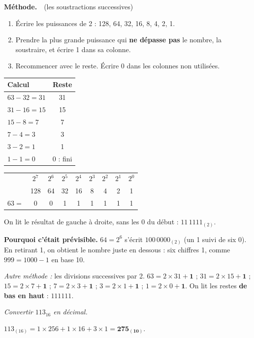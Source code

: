 \documentclass[addpoints, 11pt]{exam}
\newcommand{\enonce}[1]{\textit{#1}\par\smallskip}
\newcommand{\methode}{\par\smallskip\noindent\textbf{Méthode.}\ }
\DeclareRobustCommand{\_}{\textunderscore\allowbreak}
\begin{document}
\begin{questions}
\methode\ (les soustractions successives)
\begin{enumerate}
  \item Écrire les puissances de 2 : 128, 64, 32, 16, 8, 4, 2, 1.
  \item Prendre la plus grande puissance qui \textbf{ne dépasse pas} le nombre, la soustraire, et écrire 1 dans sa colonne.
  \item Recommencer avec le reste. Écrire 0 dans les colonnes non utilisées.
\end{enumerate}
\begin{center}
\begin{tabular}{|l|c|}
\hline
Calcul & Reste \\ \hline
$63 - 32 = 31$ & 31 \\
$31 - 16 = 15$ & 15 \\
$15 - 8 = 7$ & 7 \\
$7 - 4 = 3$ & 3 \\
$3 - 2 = 1$ & 1 \\
$1 - 1 = 0$ & 0 : fini \\ \hline
\end{tabular}
\qquad
\begin{tabular}{l|cccccccc}
 & $2^7$ & $2^6$ & $2^5$ & $2^4$ & $2^3$ & $2^2$ & $2^1$ & $2^0$\\
 & 128 & 64 & 32 & 16 & 8 & 4 & 2 & 1\\ \hline
$63 =$ & 0 & 0 & 1 & 1 & 1 & 1 & 1 & 1\\
\end{tabular}
\end{center}
On lit le résultat de gauche à droite, sans les 0 du début : $11\,1111_{(2)}$.

\textbf{Pourquoi c'était prévisible.} $64 = 2^6$ s'écrit $100\,0000_{(2)}$ (un 1 suivi de six 0). En retirant 1, on obtient le nombre juste en dessous : six chiffres 1, comme $999 = 1000 - 1$ en base 10.

\textit{Autre méthode :} les divisions successives par 2. $63 = 2 \times 31 + \mathbf{1}$ ; $31 = 2 \times 15 + \mathbf{1}$ ; $15 = 2 \times 7 + \mathbf{1}$ ; $7 = 2 \times 3 + \mathbf{1}$ ; $3 = 2 \times 1 + \mathbf{1}$ ; $1 = 2 \times 0 + \mathbf{1}$. On lit les restes \textbf{de bas en haut} : $111111$.

\question[1] \enonce{Convertir $113_{16}$ en décimal.}

\begin{reponse}
$113_{(16)} = 1 \times 256 + 1 \times 16 + 3 \times 1 = \mathbf{275_{(10)}}$.
\end{reponse}


\end{questions}
\end{document}
